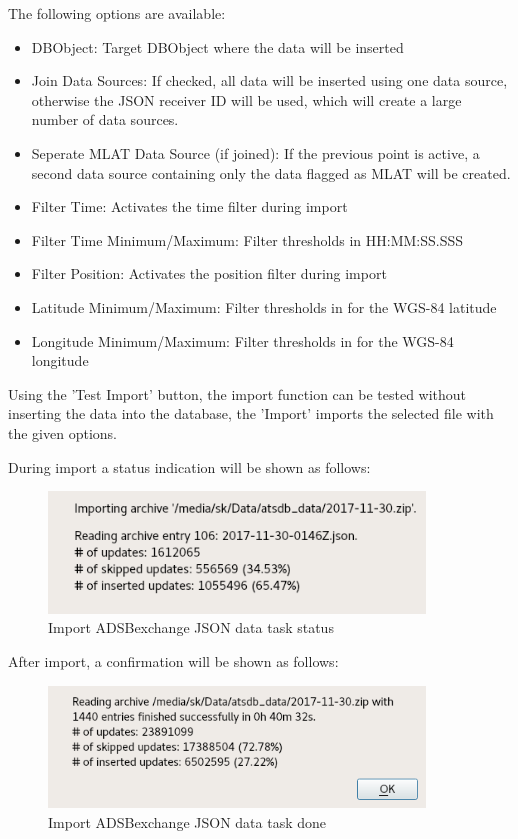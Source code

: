 The following options are available:
\begin{itemize}  
\item DBObject: Target DBObject where the data will be inserted
\item Join Data Sources: If checked, all data will be inserted using one data source, otherwise the JSON receiver ID will be used, which will create a large number of data sources.
\item Seperate MLAT Data Source (if joined): If the previous point is active, a second data source containing only the data flagged as MLAT will be created.
\item Filter Time: Activates the time filter during import
\item Filter Time Minimum/Maximum: Filter thresholds in HH:MM:SS.SSS
\item Filter Position: Activates the position filter during import
\item Latitude Minimum/Maximum: Filter thresholds in for the WGS-84 latitude
\item Longitude Minimum/Maximum: Filter thresholds in for the WGS-84 longitude
\end{itemize}

Using the 'Test Import' button, the import function can be tested without inserting the data into the database, the 'Import' imports the selected file with the given options.

During import a status indication will be shown as follows:

\begin{figure}[H]
  \center
    \includegraphics[width=10cm,frame]{../screenshots/json_import_status.png}
  \caption{Import ADSBexchange JSON data task status}
\end{figure}

After import, a confirmation will be shown as follows:

\begin{figure}[H]
  \center
    \includegraphics[width=10cm,frame]{../screenshots/json_import_done.png}
  \caption{Import ADSBexchange JSON data task done}
\end{figure}

